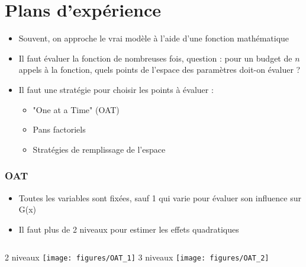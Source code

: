 \documentclass[10pt]{beamer}
\begin{document}
\section{Plans d'expérience}

\begin{frame}

\begin{itemize}
\item Souvent, on approche le vrai modèle à l'aide d'une fonction mathématique
\item Il faut évaluer la fonction de nombreuses fois, question : pour un budget de $ n $ appels à la fonction, quels points de l'espace des paramètres doit-on évaluer ?
\item Il faut une stratégie pour choisir les points à évaluer :
\begin{itemize}
	\item "One at a Time" (OAT)
	\item Pans factoriels
	\item Stratégies de remplissage de l'espace
\end{itemize}
\end{itemize}

\end{frame}

\begin{frame}
\frametitle{OAT}
\bigskip

\begin{itemize}
	\item Toutes les variables sont fixées, sauf 1 qui varie pour évaluer son influence sur G(x)
	\item Il faut plus de 2 niveaux pour estimer les effets quadratiques
\end{itemize}

\begin{columns}
	2 niveaux
	\texttt{[image: figures/OAT\_1]}
	3 niveaux
	\texttt{[image: figures/OAT\_2]}
\end{columns}

\end{frame}
\end{document}
